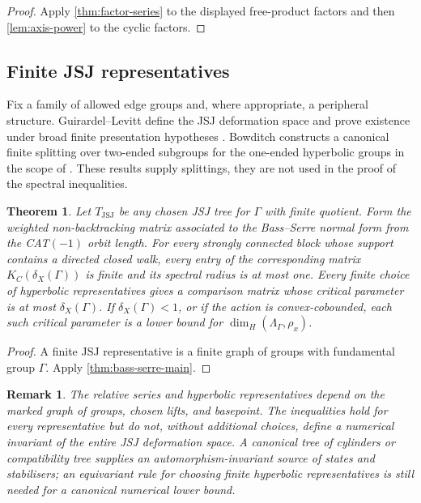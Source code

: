 \documentclass[11pt]{article}
\newtheorem{theorem}{Theorem}[section]
\newtheorem{remark}[remark]{Remark}
\theoremstyle{definition}
\begin{document}
\begin{proof}
Apply \cref{thm:factor-series} to the displayed free-product factors and then
\cref{lem:axis-power} to the cyclic factors.
\end{proof}

\subsection{Finite JSJ representatives}
Fix a family of allowed edge groups and, where appropriate, a peripheral structure.
Guirardel--Levitt define the JSJ deformation space and prove existence under broad finite
presentation hypotheses \cite{GuirardelLevitt2017}.  Bowditch constructs a canonical finite
splitting over two-ended subgroups for the one-ended hyperbolic groups in the scope of
\cite[Theorem~0.1]{Bowditch1998}.  These results supply splittings, they are not used in the
proof of the spectral inequalities.

\begin{theorem}
\label{thm:JSJ}
Let $T_{\mathrm{JSJ}}$ be any chosen JSJ tree for $\Gamma$ with finite quotient.  Form the
weighted non-backtracking matrix associated to the Bass--Serre normal form from the CAT$(-1)$ orbit length.  For every strongly connected block whose support contains a directed closed walk, every
entry of the corresponding matrix $K_C(\delta_X(\Gamma))$ is finite and its spectral radius
is at most one.  Every finite choice of hyperbolic representatives gives a comparison matrix
whose critical parameter is at most $\delta_X(\Gamma)$.  If $\delta_X(\Gamma)<1$, or if
the action is convex-cobounded, each such critical parameter is a lower bound for
$\dim_H(\Lambda_\Gamma,\rho_x)$.
\end{theorem}

\begin{proof}
A finite JSJ representative is a finite graph of groups with fundamental group $\Gamma$.
Apply \cref{thm:bass-serre-main}.
\end{proof}

\begin{remark}
The relative series and hyperbolic representatives depend on the marked graph of groups, chosen
lifts, and basepoint.  The inequalities hold for every representative but do not, without
additional choices, define a numerical invariant of the entire JSJ deformation space.  A
canonical tree of cylinders or compatibility tree supplies an automorphism-invariant source
of states and stabilisers; an equivariant rule for choosing finite hyperbolic representatives is
still needed for a canonical numerical lower bound.
\end{remark}
\end{document}
